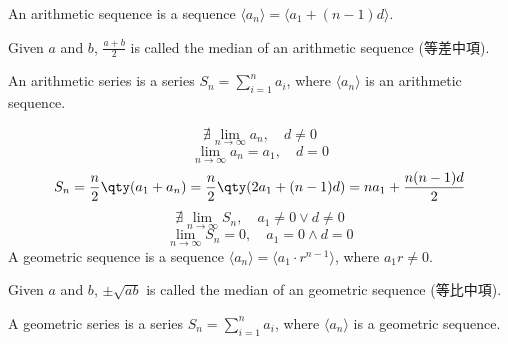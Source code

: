\documentclass[a4paper,12pt]{report}
\begin{document}
An arithmetic sequence is a sequence $\langle a_n\rangle=\langle a_1+(n-1)d\rangle$. 

Given $a$ and $b$, $\frac{a+b}{2}$ is called the median of an arithmetic sequence (等差中項).

An arithmetic series is a series $S_n=\sum_{i=1}^na_i$, where $\langle a_n\rangle$ is an arithmetic sequence.

\[\nexists\lim_{n\to\infty}a_n,\quad d\neq 0\]
\[\lim_{n\to\infty}a_n=a_1,\quad d=0\]
\[S_n=\frac{n}{2}\qty(a_1+a_n)=\frac{n}{2}\qty(2a_1+(n-1)d)=na_1+\frac{n(n-1)d}{2}\]
\[\nexists\lim_{n\to\infty}S_n,\quad a_1\neq 0\lor d\neq 0\]
\[\lim_{n\to\infty}S_n=0,\quad a_1=0\land d=0\]
A geometric sequence is a sequence $\langle a_n\rangle=\langle a_1\cdot r^{n-1}\rangle$, where $a_1r\neq 0$.

Given $a$ and $b$, $\pm\sqrt{ab}$ is called the median of an geometric sequence (等比中項).

A geometric series is a series $S_n=\sum_{i=1}^na_i$, where $\langle a_n\rangle$ is a geometric sequence.
\end{document}
